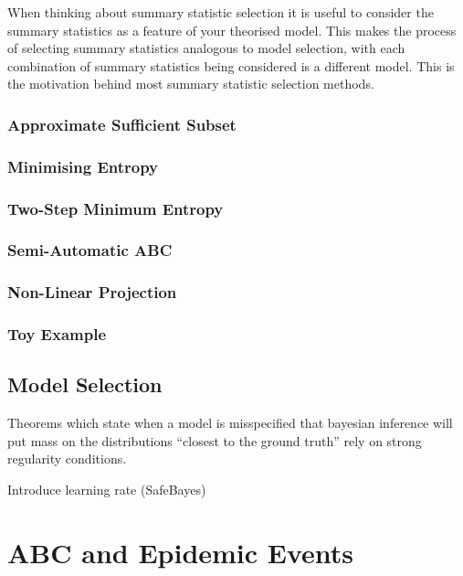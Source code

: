 \documentclass[11pt,a4paper,margin=0]{article}
\begin{document}
\par When thinking about summary statistic selection it is useful to consider the summary statistics as a feature of your theorised model. This makes the process of selecting summary statistics analogous to model selection, with each combination of summary statistics being considered is a different model. This is the motivation behind most summary statistic selection methods.

\subsubsection*{Approximate Sufficient Subset \cite{Approximately_sufficient_statistics_and_bayesian_computation}}
\subsubsection*{Minimising Entropy \cite{on_optimal_selection_of_summary_stats_for_ABC}}
\subsubsection*{Two-Step Minimum Entropy \cite{on_optimal_selection_of_summary_stats_for_ABC}}
\subsubsection*{Semi-Automatic ABC \cite{constructing_summary_statistics_for_approximate_bayesian_computation_semi_automatic_ABC}}
\subsubsection*{Non-Linear Projection}
\subsubsection*{Toy Example}

\subsection{Model Selection}

  \par Theorems which state when a model is misspecified that bayesian inference will put mass on the distributions ``closest to the ground truth'' rely on strong regularity conditions. \cite{inconsistency_of_bayesian_inference_for_misspecified_linear_models_and_a_proposal_for_reparing_it}
  \par Introduce learning rate (SafeBayes) \cite{inconsistency_of_bayesian_inference_for_misspecified_linear_models_and_a_proposal_for_reparing_it}

\newpage
\section{ABC and Epidemic Events}\label{sec_epidemic_events}

\newpage


\end{document}
